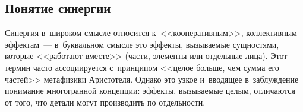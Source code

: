 \begin{multicols}{2}
\section{Понятие синергии}

\vspace*{-2pt}

  Синергия в~широком смысле относится к~<<кооперативным>>, 
коллективным эффектам~--- в~бук\-валь\-ном смысле это эффекты, вызываемые 
сущностями, которые <<работают вместе>> (части, элементы или отдельные 
лица). Этот термин часто ассоциируется с~принципом <<целое больше, чем 
сумма его частей>> метафизики Аристотеля. Однако это узкое и~вводящее 
в~заблуждение понимание многогранной концепции: эффекты, вызываемые 
целым, отличаются от того, что детали могут производить по отдельности.

\begin{table*}\small
\begin{center}
\vspace*{2ex}


\end{center}
\end{table*}
\end{multicols}
